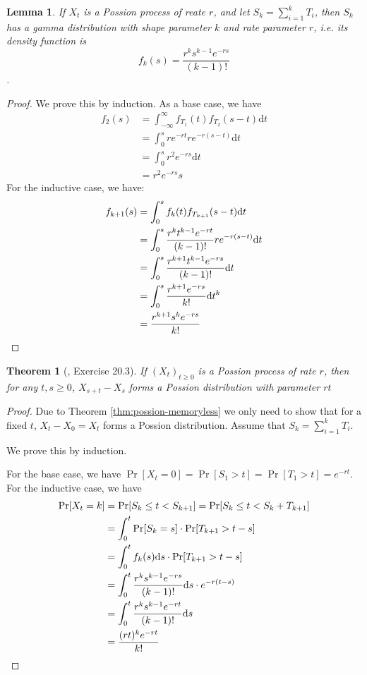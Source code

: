 \documentclass{article}
\newtheorem{theorem}{Theorem}[section]
\newtheorem{lemma}{Lemma}[section]
\begin{document}
\begin{lemma}
  If $X_t$ is a Possion process of reate $r$, and let $S_k = \sum_{i=1}^k T_i$, then $S_k$ has a gamma distribution with shape parameter $k$ and rate parameter $r$, i.e. its density function is
  \[f_k(s) = \frac{r^ks^{k-1}e^{-r s}}{(k-1)!}\].
\end{lemma}
\begin{proof}
  We prove this by induction.
  As a base case, we have
  \begin{align*}
    f_2(s)
    &= \int_{-\infty}^\infty f_{T_1}(t) f_{T_2}(s - t) \mathrm{d} t \\
    &= \int_{0}^s r e^{-rt} r e^{-r(s-t)}\mathrm{d} t \\
    &= \int_{0}^s r^2 e^{-rs} \mathrm{d} t \\
    &= r^2 e^{-rs} s
  \end{align*}
  For the inductive case, we have:
  \begin{align*}
    f_{k+1}(s)
    &= \int_0^s f_k(t)f_{T_{k+1}}(s-t)\mathrm{d} t \\
    &= \int_0^s \frac{r^kt^{k-1}e^{-rt}}{(k-1)!} re^{-r(s-t)} \mathrm{d} t \\
    &= \int_0^s \frac{r^{k+1}t^{k-1}e^{-rs}}{(k-1)!} \mathrm{d} t \\
    &= \int_0^s \frac{r^{k+1}e^{-rs}}{k!} \mathrm{d} t^k \\
    &= \frac{r^{k+1}s^ke^{-r s}}{k!} \qedhere
  \end{align*}
\end{proof}

\begin{theorem}[\cite{levin2017markov}, Exercise 20.3] \label{thm:possion-process-to-possion-distri}
  If $(X_t)_{t\geq 0}$ is a Possion process of rate $r$, then for any $t, s \geq 0$,
  $X_{s+t} - X_s$ forms a Possion distribution with parameter $rt$
\end{theorem}
\begin{proof}
  Due to Theorem \ref{thm:possion-memoryless} we only need to show that for a fixed $t$, $X_t - X_0 = X_t$ forms a Possion distribution. Assume that $S_k = \sum_{i=1}^k T_i$.
  
  We prove this by induction.

  For the base case, we have $\Pr[X_t = 0] = \Pr[S_1 > t] = \Pr[T_1 > t] = e^{-rt}$. 
  For the inductive case, we have
  \begin{align*}
    \Pr[X_t = k]
    &= \Pr[S_k \leq t < S_{k+1}] = \Pr[S_k \leq t < S_k + T_{k+1}] \\
    &= \int_0^t \Pr[S_k = s] \cdot \Pr[T_{k+1} > t - s] \\
    &= \int_0^t f_k(s)\mathrm{d} s \cdot \Pr[T_{k+1} > t - s] \\
    &= \int_0^t \frac{r^ks^{k-1}e^{-rs}}{(k-1)!}\mathrm{d}s \cdot e^{-r(t - s)} \\
    &= \int_0^t \frac{r^ks^{k-1}e^{-rt}}{(k-1)!}\mathrm{d}s \\
    &= \frac{(rt)^ke^{-rt}}{k!} \qedhere
  \end{align*}
\end{proof}
\end{document}

